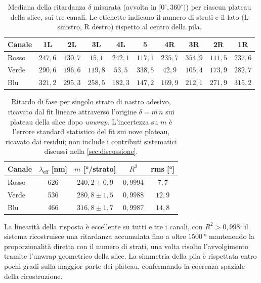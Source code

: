 \begin{table}[H]
    \centering
    \caption{Mediana della ritardanza $\delta$ misurata (avvolta in $[0^\circ, 360^\circ)$) per ciascun plateau della slice, sui tre canali. Le etichette indicano il numero di strati e il lato (L sinistro, R destro) rispetto al centro della pila.}
    \label{tab:nastro_plateau}
    \begin{tabular}{lccccccccc}
        \hline
        \textbf{Canale} & 1L & 2L & 3L & 4L & 5 & 4R & 3R & 2R & 1R \\
        \hline
        Rosso & $247{,}6$ & $130{,}7$ & $15{,}1$  & $242{,}1$ & $117{,}1$ & $235{,}7$ & $354{,}9$ & $111{,}5$ & $237{,}6$ \\
        Verde & $290{,}6$ & $196{,}6$ & $119{,}8$ & $53{,}5$  & $338{,}5$ & $42{,}9$  & $105{,}4$ & $173{,}9$ & $282{,}7$ \\
        Blu   & $321{,}2$ & $295{,}3$ & $258{,}5$ & $182{,}3$ & $147{,}2$ & $169{,}9$ & $212{,}1$ & $271{,}9$ & $315{,}2$ \\
        \hline
    \end{tabular}
\end{table}

\begin{table}[H]
    \centering
    \caption{Ritardo di fase per singolo strato di nastro adesivo, ricavato dal fit lineare attraverso l'origine $\delta = m\,n$ sui plateau della slice dopo \emph{unwrap}. L'incertezza su $m$ è l'errore standard statistico del fit sui nove plateau, ricavato dai residui; non include i contributi sistematici discussi nella \cref{sec:discussione}.}
    \label{tab:nastro_slope}
    \begin{tabular}{lcccc}
        \hline
        \textbf{Canale} & $\lambda_\mathrm{eff}$ [\si{\nano\meter}] & $m$ [\si{\degree}/strato] & $R^2$ & rms [\si{\degree}] \\
        \hline
        Rosso & 626 & $240{,}2 \pm 0{,}9$ & $0{,}9994$ & $7{,}7$  \\
        Verde & 536 & $280{,}8 \pm 1{,}5$ & $0{,}9988$ & $12{,}9$ \\
        Blu   & 466 & $316{,}8 \pm 1{,}7$ & $0{,}9987$ & $14{,}8$ \\
        \hline
    \end{tabular}
\end{table}

La linearità della risposta è eccellente su tutti e tre i canali, con $R^2 > 0{,}998$: il sistema ricostruisce una ritardanza accumulata fino a oltre $\SI{1500}{\degree}$ mantenendo la proporzionalità diretta con il numero di strati, una volta risolto l'avvolgimento tramite l'unwrap geometrico della slice. La simmetria della pila è rispettata entro pochi gradi sulla maggior parte dei plateau, confermando la coerenza spaziale della ricostruzione.

